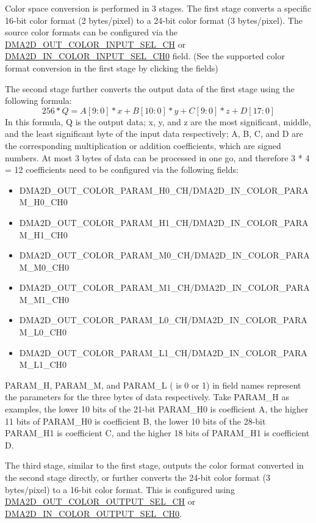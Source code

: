 \documentclass[main\_\_EN.tex]{subfiles}
\begin{document}
Color space conversion is performed in 3 stages. The first stage converts a specific 16-bit color format (2 bytes/pixel) to a 24-bit color format (3 bytes/pixel). The source color formats can be configured via the \hyperref[fielddesc:DMA2DOUTCOLORINPUTSELCHN]{DMA2D\_OUT\_COLOR\_INPUT\_SEL\_CH} or \hyperref[fielddesc:DMA2DINCOLORINPUTSELCH0]{DMA2D\_IN\_COLOR\_INPUT\_SEL\_CH0} field. (See the supported color format conversion in the first stage by clicking the fields)

The second stage further converts the output data of the first stage using the following formula:
\[
256*Q = A[9:0] * x + B[10:0] * y + C[9:0] * z + D[17:0]
\]
In this formula, Q is the output data; x, y, and z are the most significant, middle, and the least significant byte of the input data respectively;  A, B, C, and D are the corresponding multiplication or addition coefficients, which are signed numbers. At most 3 bytes of data can be processed in one go, and therefore 3 * 4 = 12 coefficients need to be configured via the following fields:
\begin{itemize}
    \item DMA2D\_OUT\_COLOR\_PARAM\_H0\_CH/DMA2D\_IN\_COLOR\_PARAM\_H0\_CH0
    \item DMA2D\_OUT\_COLOR\_PARAM\_H1\_CH/DMA2D\_IN\_COLOR\_PARAM\_H1\_CH0
    \item DMA2D\_OUT\_COLOR\_PARAM\_M0\_CH/DMA2D\_IN\_COLOR\_PARAM\_M0\_CH0
    \item DMA2D\_OUT\_COLOR\_PARAM\_M1\_CH/DMA2D\_IN\_COLOR\_PARAM\_M1\_CH0
    \item DMA2D\_OUT\_COLOR\_PARAM\_L0\_CH/DMA2D\_IN\_COLOR\_PARAM\_L0\_CH0
    \item DMA2D\_OUT\_COLOR\_PARAM\_L1\_CH/DMA2D\_IN\_COLOR\_PARAM\_L1\_CH0
\end{itemize}
PARAM\_H, PARAM\_M, and PARAM\_L ( is 0 or 1) in field names represent the parameters for the three bytes of data respectively. Take PARAM\_H as examples, the lower 10 bits of the 21-bit PARAM\_H0 is coefficient A, the higher 11 bits of PARAM\_H0 is coefficient B, the lower 10 bits of the 28-bit PARAM\_H1 is coefficient C, and the higher 18 bits of PARAM\_H1 is coefficient D.

The third stage, similar to the first stage, outputs the color format converted in the second stage directly, or further converts the 24-bit color format (3 bytes/pixel) to a 16-bit color format. This is configured using \hyperref[fielddesc:DMA2DOUTCOLOROUTPUTSELCHN]{DMA2D\_OUT\_COLOR\_OUTPUT\_SEL\_CH} or \hyperref[fielddesc:DMA2DINCOLOROUTPUTSELCH0]{DMA2D\_IN\_COLOR\_OUTPUT\_SEL\_CH0}.
\end{document}
